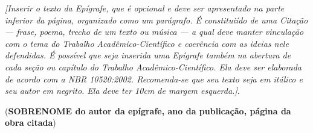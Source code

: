 \vspace*{\fill}

\begin{epigrafe}
    \textit{[Inserir o texto da Epígrafe, que é opcional e deve ser apresentado na parte inferior da página, organizado como um parágrafo. É constituiído de uma Citação --- frase, poema, trecho de um texto ou música --- a qual deve manter vinculação com o tema do Trabalho Acadêmico-Científico e coerência com as ideias nele defendidas. É possível que seja inserida uma Epígrafe também na abertura de cada seção ou capítulo do Trabalho Acadêmico-Científico. Ela deve ser elaborada de acordo com a NBR 10520:2002. Recomenda-se que seu texto seja em itálico e seu autor em negrito. Ela deve ter 10cm de margem esquerda.]}.
    
    (\textbf{SOBRENOME do autor da epígrafe, ano da publicação, página da obra citada})
\end{epigrafe}

\OnesideTwoside{\clearpage}{\cleardoublepage}